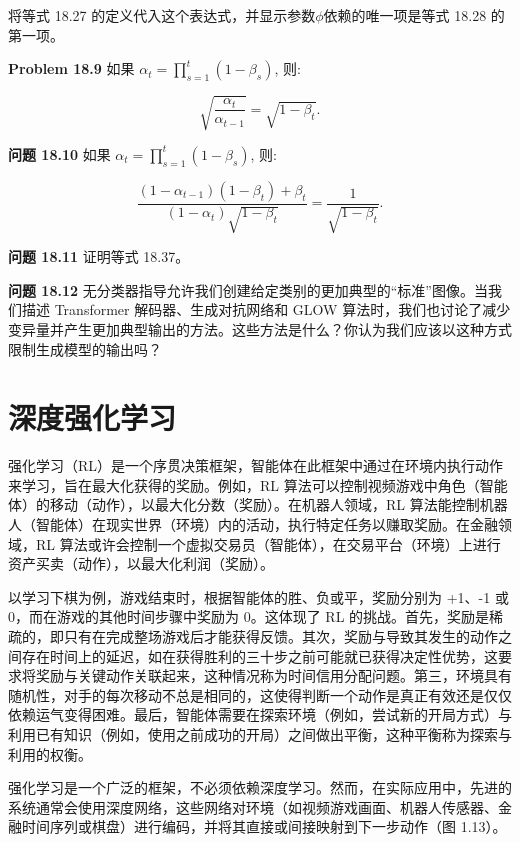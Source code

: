 \documentclass[lang=cn,newtx,10pt,scheme=chinese]{elegantbook}
\begin{document}
将等式 18.27 的定义代入这个表达式，并显示参数\(\phi\)依赖的唯一项是等式 18.28 的第一项。

\textbf{Problem 18.9} 如果 \(\alpha_t = \prod_{s=1}^{t} (1 - \beta_s)\), 则:

\begin{equation}
\sqrt{\frac{\alpha_t}{\alpha_{t-1}}} = \sqrt{1 - \beta_t}. 
\end{equation}

\textbf{问题 18.10} 如果 \(\alpha_t = \prod_{s=1}^{t} (1 - \beta_s)\), 则:

\begin{equation}
\frac{(1 - \alpha_{t-1})(1 - \beta_t) + \beta_t}{(1 - \alpha_t)\sqrt{1 - \beta_t}} = \frac{1}{\sqrt{1 - \beta_t}}. 
\end{equation}

\textbf{问题 18.11} 证明等式 18.37。

\textbf{问题 18.12} 无分类器指导允许我们创建给定类别的更加典型的“标准”图像。当我们描述 Transformer 解码器、生成对抗网络和 GLOW 算法时，我们也讨论了减少变异量并产生更加典型输出的方法。这些方法是什么？你认为我们应该以这种方式限制生成模型的输出吗？


\chapter{深度强化学习}

强化学习（RL）是一个序贯决策框架，智能体在此框架中通过在环境内执行动作来学习，旨在最大化获得的奖励。例如，RL 算法可以控制视频游戏中角色（智能体）的移动（动作），以最大化分数（奖励）。在机器人领域，RL 算法能控制机器人（智能体）在现实世界（环境）内的活动，执行特定任务以赚取奖励。在金融领域，RL 算法或许会控制一个虚拟交易员（智能体），在交易平台（环境）上进行资产买卖（动作），以最大化利润（奖励）。

以学习下棋为例，游戏结束时，根据智能体的胜、负或平，奖励分别为 +1、-1 或 0，而在游戏的其他时间步骤中奖励为 0。这体现了 RL 的挑战。首先，奖励是稀疏的，即只有在完成整场游戏后才能获得反馈。其次，奖励与导致其发生的动作之间存在时间上的延迟，如在获得胜利的三十步之前可能就已获得决定性优势，这要求将奖励与关键动作关联起来，这种情况称为时间信用分配问题。第三，环境具有随机性，对手的每次移动不总是相同的，这使得判断一个动作是真正有效还是仅仅依赖运气变得困难。最后，智能体需要在探索环境（例如，尝试新的开局方式）与利用已有知识（例如，使用之前成功的开局）之间做出平衡，这种平衡称为探索与利用的权衡。

强化学习是一个广泛的框架，不必须依赖深度学习。然而，在实际应用中，先进的系统通常会使用深度网络，这些网络对环境（如视频游戏画面、机器人传感器、金融时间序列或棋盘）进行编码，并将其直接或间接映射到下一步动作（图 1.13）。
\end{document}
